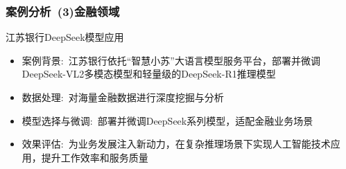 %
\begin{frame}[allowframebreaks]
	\frametitle{案例分析~\textrm{(3)}金融领域}
江苏银行\textrm{DeepSeek}模型应用
            \begin{itemize}
		\setlength{\itemsep}{10pt}
		    \item 案例背景:~江苏银行依托``智慧小苏''大语言模型服务平台，部署并微调\textrm{DeepSeek-VL2}多模态模型和轻量级的\textrm{DeepSeek-R1}推理模型
                \item 数据处理:~对海量金融数据进行深度挖掘与分析
		\item 模型选择与微调:~部署并微调\textrm{DeepSeek}系列模型，适配金融业务场景
                \item 效果评估:~为业务发展注入新动力，在复杂推理场景下实现人工智能技术应用，提升工作效率和服务质量
            \end{itemize}
\end{frame}
%
